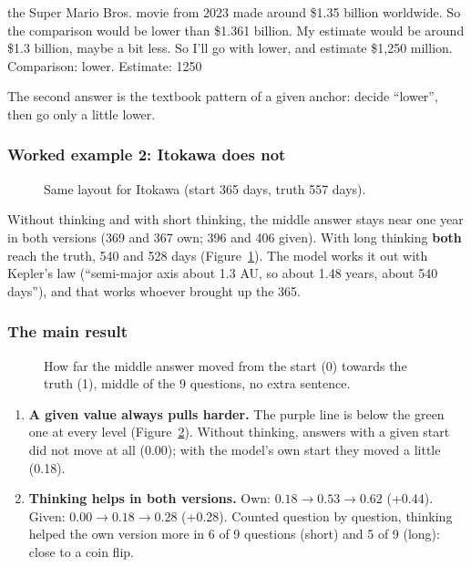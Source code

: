 \documentclass[11pt,a4paper]{article}
\begin{document}
\begin{transcript}
\cut{} the Super Mario Bros. movie from 2023 \cut{} made around \$1.35 billion worldwide. \cut{} So the comparison would be lower than \$1.361 billion. My estimate would be around \$1.3 billion, maybe a bit less. \cut{} So I'll go with lower, and estimate \$1,250 million.
 Comparison: lower. Estimate: 1250
\end{transcript}
The second answer is the textbook pattern of a given anchor: decide \enquote{lower}, then go only a little lower.

\subsubsection{Worked example 2: Itokawa does not}
\begin{figure}[ht]
\centering{}
\caption{Same layout for Itokawa (start 365 days, truth 557 days).}
\label{e5:fig:itokawa}
\end{figure}
Without thinking and with short thinking, the middle answer stays near one year in both versions (369 and 367 own; 396 and 406 given). With long thinking \textbf{both} reach the truth, 540 and 528 days (Figure~\ref{e5:fig:itokawa}). The model works it out with Kepler's law (\enquote{semi-major axis about 1.3 AU, so about 1.48 years, about 540 days}), and that works whoever brought up the 365.

\subsubsection{The main result}
\begin{figure}[ht]
\centering{}
\caption{How far the middle answer moved from the start (0) towards the truth (1), middle of the 9 questions, no extra sentence.}
\label{e5:fig:main}
\end{figure}

\begin{enumerate}[leftmargin=*]
  \item \textbf{A given value always pulls harder.} The purple line is below the green one at every level (Figure~\ref{e5:fig:main}). Without thinking, answers with a given start did not move at all (0.00); with the model's own start they moved a little (0.18).
  \item \textbf{Thinking helps in both versions.} Own: $0.18 \to 0.53 \to 0.62$ (+0.44). Given: $0.00 \to 0.18 \to 0.28$ (+0.28). Counted question by question, thinking helped the own version more in 6 of 9 questions (short) and 5 of 9 (long): close to a coin flip.
\end{enumerate}
\end{document}
